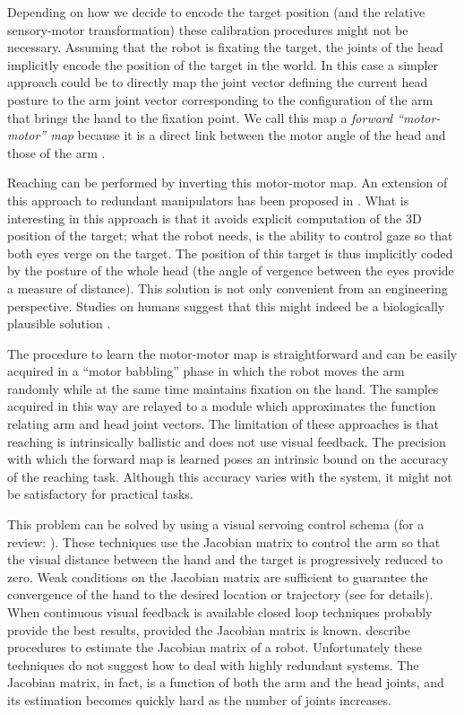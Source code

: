 Depending on how we decide to encode the target position (and the 
relative sensory-motor transformation)
these calibration procedures might not be necessary. Assuming that 
the robot is fixating the target, the joints of the head implicitly 
encode the position of the target in the world. In this case a simpler 
approach could be to directly map the joint vector defining the current 
head posture to the arm joint vector corresponding to the configuration 
of the arm that brings the hand to the fixation point. We call this map 
a {\em forward ``motor-motor'' map} because it is a direct link between the motor 
angle of the head and those of the arm 
\cite{blackburn94learning,metta99developmental}. 

Reaching can be performed by inverting this motor-motor 
map. An extension of this approach to redundant manipulators has
been proposed in \cite{lopes06learning}. What is interesting in this 
approach is that it avoids explicit computation of the 3D position 
of the target; what the robot needs, is the ability to control gaze
so that both eyes verge on the target. The position of 
this target is thus implicitly coded by the posture of the whole head (the 
angle of vergence between the eyes provide a measure of distance). 
This solution is not only convenient from an engineering perspective. Studies 
on humans suggest that this might indeed be a biologically plausible 
solution \cite{flanders-daghestani-berthoz-1999}.

The procedure to learn the motor-motor map is straightforward and can be 
easily acquired in a ``motor babbling'' phase in which the robot moves 
the arm randomly while at the same time maintains fixation on the hand. 
The samples acquired in this way are relayed to a module which 
approximates the function relating arm and head joint vectors. The 
limitation of these approaches is that reaching
is intrinsically ballistic and does not use visual feedback. The precision 
with which the forward map is learned poses an intrinsic bound on
the accuracy of the reaching task. Although this accuracy varies with the
system, it might not be satisfactory for practical tasks.

This problem can be solved by using a visual servoing control schema (for a 
review: \cite{hutchinson96tutorial}). These techniques use the 
Jacobian matrix to control the arm so that the visual distance between the 
hand and the target is progressively reduced to zero. Weak conditions 
on the Jacobian matrix are sufficient to guarantee the convergence 
of the hand to the desired location or trajectory (see \cite{Samson91robot} for details). When continuous visual 
feedback is available closed loop techniques probably provide the best 
results, provided the Jacobian matrix is known. \cite{Hosoda94versatile,Mansard06jacobian,Lapreste04efficient} 
describe procedures to estimate the Jacobian matrix of a robot. Unfortunately 
these techniques do not suggest how to deal with highly redundant systems.
The Jacobian matrix, in fact, is a function
of both the arm and the head joints, and its estimation becomes
quickly hard as the number of joints increases.

